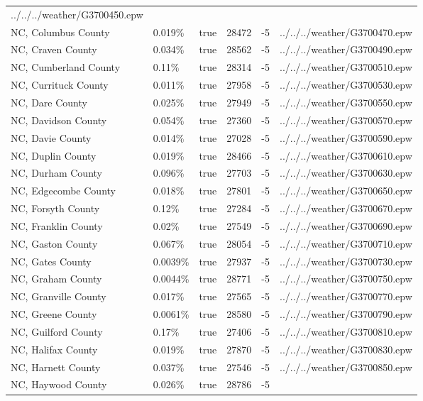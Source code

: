\begin{longtable}[]{@{}llllll@{}}
../../../weather/G3700450.epw \\
NC, Columbus County & 0.019\% & true & 28472 & -5 &
../../../weather/G3700470.epw \\
NC, Craven County & 0.034\% & true & 28562 & -5 &
../../../weather/G3700490.epw \\
NC, Cumberland County & 0.11\% & true & 28314 & -5 &
../../../weather/G3700510.epw \\
NC, Currituck County & 0.011\% & true & 27958 & -5 &
../../../weather/G3700530.epw \\
NC, Dare County & 0.025\% & true & 27949 & -5 &
../../../weather/G3700550.epw \\
NC, Davidson County & 0.054\% & true & 27360 & -5 &
../../../weather/G3700570.epw \\
NC, Davie County & 0.014\% & true & 27028 & -5 &
../../../weather/G3700590.epw \\
NC, Duplin County & 0.019\% & true & 28466 & -5 &
../../../weather/G3700610.epw \\
NC, Durham County & 0.096\% & true & 27703 & -5 &
../../../weather/G3700630.epw \\
NC, Edgecombe County & 0.018\% & true & 27801 & -5 &
../../../weather/G3700650.epw \\
NC, Forsyth County & 0.12\% & true & 27284 & -5 &
../../../weather/G3700670.epw \\
NC, Franklin County & 0.02\% & true & 27549 & -5 &
../../../weather/G3700690.epw \\
NC, Gaston County & 0.067\% & true & 28054 & -5 &
../../../weather/G3700710.epw \\
NC, Gates County & 0.0039\% & true & 27937 & -5 &
../../../weather/G3700730.epw \\
NC, Graham County & 0.0044\% & true & 28771 & -5 &
../../../weather/G3700750.epw \\
NC, Granville County & 0.017\% & true & 27565 & -5 &
../../../weather/G3700770.epw \\
NC, Greene County & 0.0061\% & true & 28580 & -5 &
../../../weather/G3700790.epw \\
NC, Guilford County & 0.17\% & true & 27406 & -5 &
../../../weather/G3700810.epw \\
NC, Halifax County & 0.019\% & true & 27870 & -5 &
../../../weather/G3700830.epw \\
NC, Harnett County & 0.037\% & true & 27546 & -5 &
../../../weather/G3700850.epw \\
NC, Haywood County & 0.026\% & true & 28786 & -5 &

\end{longtable}
